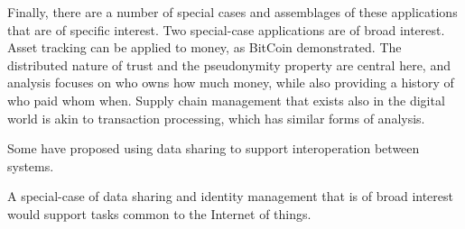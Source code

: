 \begin{itemize}
Finally, there are a number of special cases and assemblages of these applications that are of specific interest.
Two special-case applications are of broad interest.  Asset tracking can be applied to money, as BitCoin demonstrated.  The distributed nature of trust and the pseudonymity property are central here, and analysis focuses on who owns how much money, while also providing a history of who paid whom when.  Supply chain management that exists also in the digital world is akin to transaction processing, which has similar forms of analysis.

Some have proposed using data sharing to support interoperation between systems.

\end{itemize}

A special-case of data sharing and identity management that is of broad interest would support tasks common to the Internet of things.


